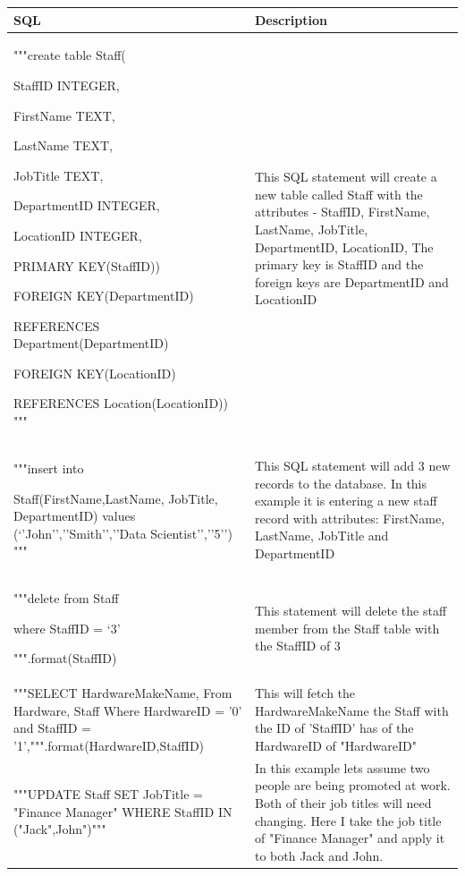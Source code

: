 \begin{center}
\begin{tabular}{|p{6cm}|p{5cm}|}
\hline
\textbf{SQL}      & \textbf{Description} \\ \hline
"""create table Staff(\

   StaffID INTEGER,\

   FirstName TEXT,\

   LastName TEXT,\

   JobTitle TEXT,\

   DepartmentID INTEGER,\

   LocationID INTEGER,\

   PRIMARY KEY(StaffID))\

   FOREIGN KEY(DepartmentID) \

   REFERENCES Department(DepartmentID)\

   FOREIGN KEY(LocationID) \

   REFERENCES Location(LocationID)) """                         & This SQL statement will create a new table called Staff with the attributes - StaffID, FirstName, LastName, JobTitle, DepartmentID, LocationID, The primary key is StaffID and the foreign keys are DepartmentID and LocationID                       \\ \hline

"""insert into\

Staff(FirstName,LastName, JobTitle, DepartmentID) values
(‘{'John'}’,’{'Smith'}’,’{'Data Scientist'}’,'{'5'}')
"""					 & This SQL statement will add 3 new records to the database. In this example it is entering a new staff record with attributes: FirstName, LastName, JobTitle and DepartmentID \\ \hline

"""delete from Staff\

where StaffID = ‘{3}’\

""".format(StaffID) & This statement will delete the staff member from the Staff table with the StaffID of {3} \\ \hline

"""SELECT HardwareMakeName,
From Hardware, Staff
Where HardwareID = '{0}' and StaffID = '{1}',""".format(HardwareID,StaffID) & This will fetch the HardwareMakeName the Staff with the ID of 'StaffID' has of the HardwareID of "HardwareID" \\ \hline

"""UPDATE Staff
	SET JobTitle = "Finance Manager"
	WHERE StaffID IN ("Jack",John")""" & In this example lets assume two people are being promoted at work. Both of their job titles will need changing. Here I take the job title of "Finance Manager" and apply it to both Jack and John.\\ \hline

\end{tabular}
\end{center}

